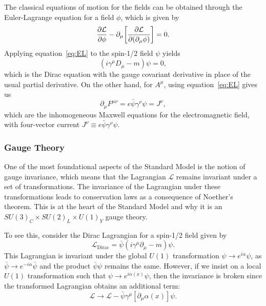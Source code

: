 The classical equations of motion for the fields can be obtained through the Euler-Lagrange equation for a field $\phi$, which is given by
\begin{equation}\label{eq:EL}
  \pdv{\mathcal{L}}{\phi}-\partial_\mu\bqty{\pdv{\mathcal{L}}{(\partial_\mu\phi)}}=0.
\end{equation}
Applying equation~\ref{eq:EL} to the spin-1/2 field $\psi$ yields
\begin{equation}
  (i\gamma^\mu D_\mu-m)\psi=0,
\end{equation}
which is the Dirac equation with the gauge covariant derivative in place of the usual partial derivative.
On the other hand, for $A^\mu$, using equation~\ref{eq:EL} gives us
\begin{equation}
  \partial_\mu F^{\mu\nu}=e\bar{\psi}\gamma^\nu\psi=J^\nu,
\end{equation}
which are the inhomogeneous Maxwell equations for the electromagnetic field, with four-vector current $J^\nu\equiv e\bar{\psi}\gamma^\nu\psi$.

\subsubsection{Gauge Theory}

One of the most foundational aspects of the Standard Model is the notion of gauge invariance, which means that the Lagrangian $\mathcal{L}$ remains invariant under a set of transformations.
The invariance of the Lagrangian under these transformations leads to conservation laws as a consequence of Noether's theorem.
This is at the heart of the Standard Model and why it is an $SU(3)_C\times SU(2)_L\times U(1)_Y$ gauge theory.

To see this, consider the Dirac Lagrangian for a spin-1/2 field given by
\begin{equation}
  \mathcal{L}_\mathrm{Dirac}=\bar{\psi}(i\gamma^\mu\partial_\mu-m)\psi.
\end{equation}
This Lagrangian is invariant under the global $U(1)$ transformation $\psi\to e^{i\alpha}\psi$, as $\bar{\psi}\to e^{-i\alpha}\bar{\psi}$ and the product $\bar{\psi}\psi$ remains the same.
However, if we insist on a local $U(1)$ transformation such that $\psi\to e^{i\alpha(x)}\psi$, then the invariance is broken since the transformed Lagrangian obtains an additional term:
\begin{equation}
  \mathcal{L}\to\mathcal{L}-\bar{\psi}\gamma^\mu[\partial_\mu\alpha(x)]\psi.
\end{equation}

